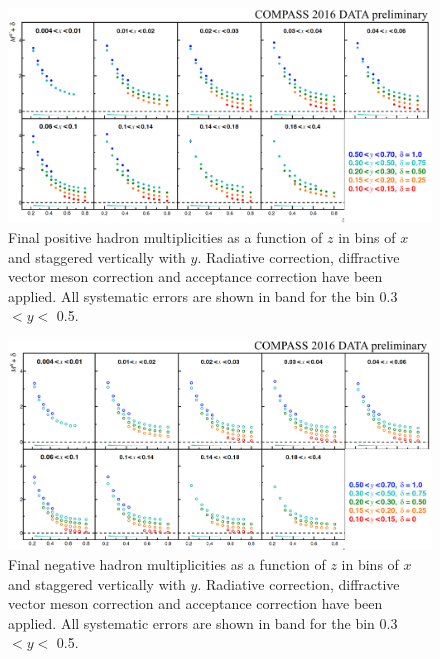 \documentclass[letterpaper,12pt]{article}
\begin{document}
\begin{figure}
	\centering
	\includegraphics[scale=0.5]{./gfx/hp.png}
	\caption{Final positive hadron multiplicities as a function of $z$ in bins of $x$ and staggered vertically with $y$. Radiative correction, diffractive vector meson correction and acceptance correction have been applied. All systematic errors are shown in band for the bin 0.3 $< y <$ 0.5.}
	\label{hp}
\end{figure}

\begin{figure}
	\centering
	\includegraphics[scale=0.5]{./gfx/hm.png}
	\caption{Final negative hadron multiplicities as a function of $z$ in bins of $x$ and staggered vertically with $y$. Radiative correction, diffractive vector meson correction and acceptance correction have been applied. All systematic errors are shown in band for the bin 0.3 $< y <$ 0.5.}
	\label{hm}
\end{figure}
\end{document}
